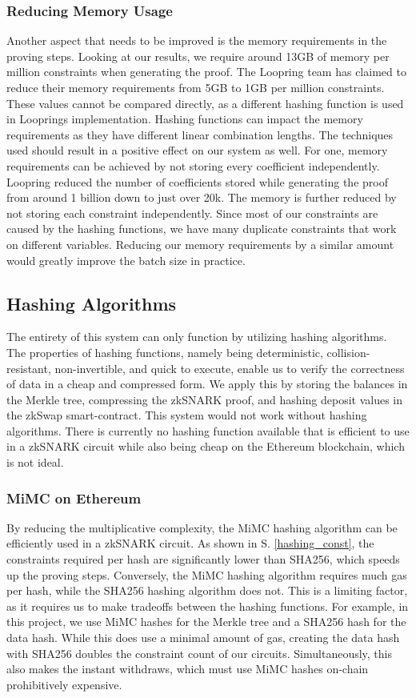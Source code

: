 \documentclass[../../thesis.tex]{subfiles}
\begin{document}
\subsubsection{Reducing Memory Usage}
Another aspect that needs to be improved is the memory requirements in the proving steps. Looking at our results, we require around 13GB of memory per million constraints when generating the proof. The Loopring team has claimed to reduce their memory requirements from 5GB to 1GB per million constraints. These values cannot be compared directly, as a different hashing function is used in Looprings implementation. Hashing functions can impact the memory requirements as they have different linear combination lengths. The techniques used should result in a positive effect on our system as well. For one, memory requirements can be achieved by not storing every coefficient independently. Loopring reduced the number of coefficients stored while generating the proof from around 1 billion down to just over 20k. The memory is further reduced by not storing each constraint independently. Since most of our constraints are caused by the hashing functions, we have many duplicate constraints that work on different variables. Reducing our memory requirements by a similar amount would greatly improve the batch size in practice. 

\subsection{Hashing Algorithms}
The entirety of this system can only function by utilizing hashing algorithms. The properties of hashing functions, namely being deterministic, collision-resistant, non-invertible, and quick to execute, enable us to verify the correctness of data in a cheap and compressed form. We apply this by storing the balances in the Merkle tree, compressing the zkSNARK proof, and hashing deposit values in the zkSwap smart-contract. This system would not work without hashing algorithms. There is currently no hashing function available that is efficient to use in a zkSNARK circuit while also being cheap on the Ethereum blockchain, which is not ideal. 

\subsubsection{MiMC on Ethereum} \label{mimc_eth}
By reducing the multiplicative complexity, the MiMC hashing algorithm can be efficiently used in a zkSNARK circuit. As shown in S. \ref{hashing_const}, the constraints required per hash are significantly lower than SHA256, which speeds up the proving steps. Conversely, the MiMC hashing algorithm requires much gas per hash, while the SHA256 hashing algorithm does not. This is a limiting factor, as it requires us to make tradeoffs between the hashing functions. For example, in this project, we use MiMC hashes for the Merkle tree and a SHA256 hash for the data hash. While this does use a minimal amount of gas, creating the data hash with SHA256 doubles the constraint count of our circuits. Simultaneously, this also makes the instant withdraws, which must use MiMC hashes on-chain prohibitively expensive. 
\end{document}
